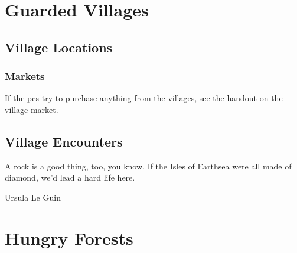 \documentclass[a4paper,openany]{book}
\begin{document}
\stopcontents[Town]

\stopcontents[sq]

\chapter{Guarded Villages}

\section{Village Locations}

\begin{multicols}{2}

\subsection{Markets}

If the \glspl{pc} try to purchase anything from the villages, see the handout on the village market.







\end{multicols}

\section{Village Encounters}


\epigraph{A rock is a good thing, too, you know. If the Isles of Earthsea were all made of diamond, we'd lead a hard life here.}{Ursula Le Guin}

\renewcommand{\sqarea}{Villages}

\begin{multicols}{2}









\stopcontents[Villages]

\end{multicols}

\chapter{Hungry Forests}
\end{document}
